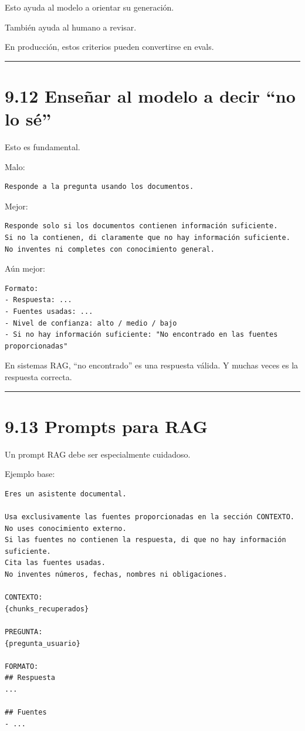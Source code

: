 Esto ayuda al modelo a orientar su generación.

También ayuda al humano a revisar.

En producción, estos criterios pueden convertirse en evals.

\begin{center}\rule{0.5\linewidth}{0.5pt}\end{center}

\section{9.12 Enseñar al modelo a decir ``no lo
sé''}\label{enseuxf1ar-al-modelo-a-decir-no-lo-suxe9}

Esto es fundamental.

Malo:

\begin{lstlisting}
Responde a la pregunta usando los documentos.
\end{lstlisting}

Mejor:

\begin{lstlisting}
Responde solo si los documentos contienen información suficiente.
Si no la contienen, di claramente que no hay información suficiente.
No inventes ni completes con conocimiento general.
\end{lstlisting}

Aún mejor:

\begin{lstlisting}
Formato:
- Respuesta: ...
- Fuentes usadas: ...
- Nivel de confianza: alto / medio / bajo
- Si no hay información suficiente: "No encontrado en las fuentes proporcionadas"
\end{lstlisting}

En sistemas RAG, ``no encontrado'' es una respuesta válida. Y muchas
veces es la respuesta correcta.

\begin{center}\rule{0.5\linewidth}{0.5pt}\end{center}

\section{9.13 Prompts para RAG}\label{prompts-para-rag}

Un prompt RAG debe ser especialmente cuidadoso.

Ejemplo base:

\begin{lstlisting}
Eres un asistente documental.

Usa exclusivamente las fuentes proporcionadas en la sección CONTEXTO.
No uses conocimiento externo.
Si las fuentes no contienen la respuesta, di que no hay información suficiente.
Cita las fuentes usadas.
No inventes números, fechas, nombres ni obligaciones.

CONTEXTO:
{chunks_recuperados}

PREGUNTA:
{pregunta_usuario}

FORMATO:
## Respuesta
...

## Fuentes
- ...
\end{lstlisting}

